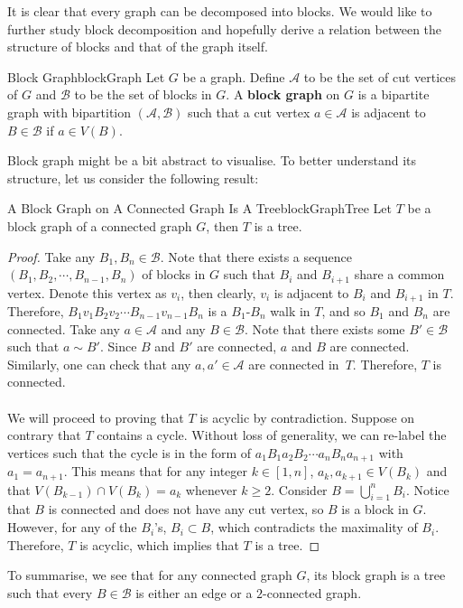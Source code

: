 \documentclass[math]{amznotes}
\theoremstyle{remark}
\newcommand{\0}{\mathbf{0}}
\newcommand{\1}{\mathbf{1}}
\begin{document}
It is clear that every graph can be decomposed into blocks. We would like to further study block decomposition and hopefully derive a relation between the structure of blocks and that of the graph itself.
\begin{dfnbox}{Block Graph}{blockGraph}
    Let $G$ be a graph. Define $\mathcal{A}$ to be the set of cut vertices of $G$ and $\mathcal{B}$ to be the set of blocks in $G$. A {\color{red} \textbf{block graph}} on $G$ is a bipartite graph with bipartition $(\mathcal{A}, \mathcal{B})$ such that a cut vertex $a \in \mathcal{A}$ is adjacent to $B \in \mathcal{B}$ if $a \in V(B)$.
\end{dfnbox}
Block graph might be a bit abstract to visualise. To better understand its structure, let us consider the following result:
\begin{probox}{A Block Graph on A Connected Graph Is A Tree}{blockGraphTree}
    Let $T$ be a block graph of a connected graph $G$, then $T$ is a tree.
    \tcblower
    \begin{proof}
        Take any $B_1, B_n \in \mathcal{B}$. Note that there exists a sequence $(B_1, B_{2}, \cdots, B_{n - 1}, B_n)$ of blocks in $G$ such that $B_i$ and $B_{i + 1}$ share a common vertex. Denote this vertex as $v_i$, then clearly, $v_i$ is adjacent to $B_i$ and $B_{i + 1}$ in $T$. Therefore, $B_1v_1B_2v_2\cdots B_{n - 1}v_{n - 1}B_n$ is a $B_1$-$B_n$ walk in $T$, and so $B_1$ and $B_n$ are connected. Take any $a \in \mathcal{A}$ and any $B \in \mathcal{B}$. Note that there exists some $B' \in \mathcal{B}$ such that $a \sim B'$. Since $B$ and $B'$ are connected, $a$ and $B$ are connected. Similarly, one can check that any $a, a' \in \mathcal{A}$ are connected in~$T$. Therefore, $T$ is connected.
        \\\\
        We will proceed to proving that $T$ is acyclic by contradiction. Suppose on contrary that $T$ contains a cycle. Without loss of generality, we can re-label the vertices such that the cycle is in the form of  $a_1B_1a_2B_2\cdots a_nB_na_{n + 1}$ with $a_1 = a_{n + 1}$. This means that for any integer $k \in [1, n]$, $a_k, a_{k + 1} \in V(B_k)$ and that $V(B_{k - 1}) \cap V(B_k) = a_k$ whenever $k \geq 2$. Consider $B = \bigcup_{i = 1}^{n}B_i$. Notice that $B$ is connected and does not have any cut vertex, so $B$ is a block in $G$. However, for any of the $B_i$'s, $B_i \subset B$, which contradicts the maximality of $B_i$. Therefore, $T$ is acyclic, which implies that $T$ is a tree.
    \end{proof}
\end{probox}
To summarise, we see that for any connected graph $G$, its block graph is a tree such that every $B \in \mathcal{B}$ is either an edge or a $2$-connected graph.
\end{document}
